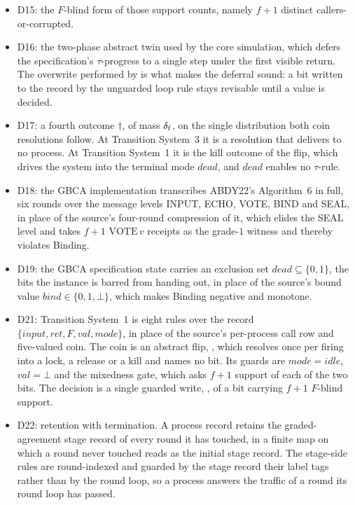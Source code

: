\begin{itemize}
  \item D15: the $F$-blind form of those support counts, namely $f+1$ distinct callers-or-corrupted.
  \item D16: the two-phase abstract twin used by the core simulation, which defers the specification's $\tau$-progress to a single  step under the first visible return.
    The overwrite performed by  is what makes the deferral sound: a bit written to the record by the unguarded loop rule stays revisable until a value is decided.
  \item D17: a fourth outcome $\dagger$, of mass $\delta_{\mathrm{f}}$, on the single distribution both coin resolutions follow.
    At Transition System~3 it is a resolution that delivers to no process.
    At Transition System~1 it is the kill outcome of the flip, which drives the system into the terminal mode $dead$, and $dead$ enables no $\tau$-rule.
  \item D18: the GBCA implementation transcribes ABDY22's Algorithm~6 in full, six rounds over the message levels INPUT, ECHO, VOTE, BIND and SEAL, in place of the source's four-round compression of it, which elides the SEAL level and takes $f{+}1$ $\mathrm{VOTE}\,v$ receipts as the grade-$1$ witness and thereby violates Binding.
  \item D19: the GBCA specification state carries an exclusion set $dead \subseteq \{0,1\}$, the bits the instance is barred from handing out, in place of the source's bound value $bind \in \{0,1,\bot\}$, which makes Binding negative and monotone.
  \item D21: Transition System~1 is eight rules over the record $\{input, ret, F, val, mode\}$, in place of the source's per-process call row and five-valued coin.
    The coin is an abstract flip, , which resolves once per firing into a lock, a release or a kill and names no bit.
    Its guards are $mode = idle$, $val = \bot$ and the mixedness gate, which asks $f+1$ support of each of the two bits.
    The decision is a single guarded write, , of a bit carrying $f+1$ $F$-blind support.
  \item D22: retention with termination.
    A process record retains the graded-agreement stage record of every round it has touched, in a finite map  on which a round never touched reads as the initial stage record.
    The stage-side rules are round-indexed and guarded by the stage record their label tags rather than by the round loop, so a process answers the traffic of a round its round loop has passed.

\end{itemize}
